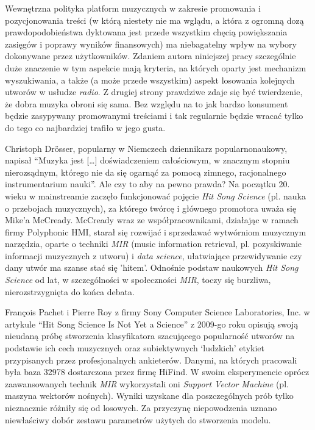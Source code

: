 \documentclass[a4paper,12pt]{article}
\numberwithin{figure}{section}
\begin{document}
    \bigskip

    Wewnętrzna polityka platform muzycznych w zakresie promowania i pozycjonowania treści (w którą niestety nie ma wglądu, a która z ogromną dozą prawdopodobieństwa dyktowana jest przede wszystkim chęcią powiększania zasięgów i poprawy wyników finansowych) ma niebagatelny wpływ na wybory dokonywane przez użytkowników\cite{PreferencjeMuzyczneWCzasachSteamingu2020}. Zdaniem autora niniejszej pracy szczególnie duże znaczenie w tym aspekcie mają kryteria, na których oparty jest mechanizm wyszukiwania, a także (a może przede wszystkim) aspekt losowania kolejnych utworów w usłudze \textit{radio}. Z drugiej strony prawdziwe zdaje się być twierdzenie, że dobra muzyka obroni się sama. Bez względu na to jak bardzo konsument będzie zasypywany promowanymi treściami i tak regularnie będzie wracać tylko do tego co najbardziej trafiło w jego gusta.

    \bigskip

    Christoph Dr{ö}sser, popularny w Niemczech dziennikarz popularnonaukowy, napisał ``Muzyka jest [\ldots] doświadczeniem całościowym, w znacznym stopniu nierozsądnym, którego nie da się ogarnąć za pomocą zimnego, racjonalnego instrumentarium nauki''\cite{MuzykaDajSieUwiesc2021}. Ale czy to aby na pewno prawda? Na początku 20. wieku w mainstreamie zaczęło funkcjonować pojęcie \textit{Hit Song Science} (pl. nauka o przebojach muzycznych), za którego twórcę i głównego promotora uważa się Mike'a McCready\cite{HitSongScienceWiki}. McCready wraz ze współpracownikami, działając w ramach firmy Polyphonic HMI, starał się rozwijać i sprzedawać wytwórniom muzycznym narzędzia, oparte o techniki \textit{MIR} (music information retrieval, pl. pozyskiwanie informacji muzycznych z utworu) i \textit{data science}, ułatwiające przewidywanie czy dany utwór ma szanse stać się 'hitem'\cite{PolyphonicHMIWiki}. Odnośnie podstaw naukowych \textit{Hit Song Science} od lat, w szczególności w społeczności \textit{MIR}, toczy się burzliwa, nierozstrzygnięta do końca debata\cite{HitSongScienceWiki}.

    \bigskip

    François Pachet i Pierre Roy z firmy Sony Computer Science Laboratories, Inc. w artykule ``Hit Song Science Is Not Yet a Science'' z 2009-go roku\cite{HitSongScienceNotYet2009} opisują swoją nieudaną próbę stworzenia klasyfikatora szacującego popularność utworów na podstawie ich cech muzycznych oraz subiektywnych `ludzkich' etykiet przypisanych przez profesjonalnych ankieterów. Danymi, na których pracowali była baza 32978 dostarczona przez firmę HiFind. W swoim eksperymencie oprócz zaawansowanych technik \textit{MIR} wykorzystali oni \textit{Support Vector Machine} (pl. maszyna wektorów nośnych). Wyniki uzyskane dla poszczególnych prób tylko nieznacznie różniły się od losowych. Za przyczynę niepowodzenia uznano niewłaściwy dobór zestawu parametrów użytych do stworzenia modelu.
\end{document}

